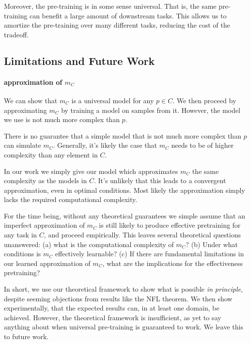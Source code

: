 \documentclass{article} %
\begin{document}
Moreover, the pre-training is in some sense universal. That is, the same pre-training can benefit a large amount of downstream tasks. This allows us to amortize the pre-training over many different tasks, reducing the cost of the tradeoff. 

\subsection{Limitations and Future Work}

\paragraph{approximation of $m_C$} We can show that $m_C$ is a universal model for any $p\in C$. We then proceed by approximating $m_C$ by training a model on samples from it. However, the model we use is not much more complex than $p$.

There is no guarantee that a simple model that is not much more complex than $p$ can simulate $m_C$. Generally, it's likely the case that $m_C$ needs to be of higher complexity than any element in $C$.\footnotemark


In our work we simply give our model which approximates $m_C$ the same complexity as the models in $C$. It's unlikely that this leads to a convergent approximation, even in optimal conditions. Most likely the approximation simply lacks the required computational complexity. 

For the time being, without any theoretical guarantees we simple assume that an imperfect approximation of $m_C$ is still likely to produce effective pretraining for any task in $C$, and proceed empirically. This leaves several theoretical questions unanswered: (a) what is the computational complexity of $m_C$? (b) Under what conditions is $m_C$ effectively learnable? (c) If there are fundamental limitations in our learned approximation of $m_C$, what are the implications for the effectiveness pretraining?

In short, we use our theoretical framework to show what is possible \emph{in principle}, despite seeming objections from results like the NFL theorem. We then show experimentally, that the expected results can, in at least one domain, be achieved. However, the theoretical framework is insufficient, as yet to say anything about when universal pre-training is guaranteed to work. We leave this to future work.
\end{document}
